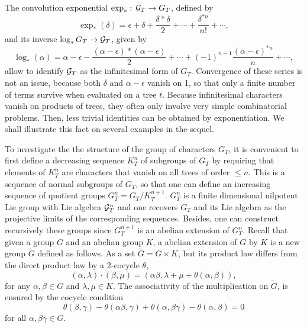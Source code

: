 \documentclass[10pt,here,feynmf]{article}
\begin{document}
The convolution exponential $\exp_{\ast}:\,{\cal G}_{T}\rightarrow G_{T}$, defined by
\begin{equation}
\exp_{\ast}(\delta)=\epsilon+\delta+\frac{\delta\ast\delta}{2}+\cdots+
\frac{\delta^{\ast n}}{n!}+\cdots,
\end{equation}
and its inverse $\log_{\ast}{G}_{T}\rightarrow {\cal G}_{T}$, given by
\begin{equation}
\log_{\ast}(\alpha)=
\alpha\!-\!\epsilon-\frac{(\alpha\!-\!\epsilon)\ast(\alpha\!-\!\epsilon)}{2}+\cdots+
(-1)^{n-1}\frac{(\alpha\!-\!\epsilon)^{\ast n}}{n}+\cdots,
\end{equation}
allow to identify ${\cal G}_{T}$ as the infinitesimal form of $G_{T}$. Convergence of these series is not an issue, because both $\delta$ and $\alpha-\epsilon$ vanish on 1, 
so that only a finite number of terms survive when evaluated on a tree $t$. Because infinitesimal characters vanish on products of trees,  they often only involve very simple combinatorial problems.  Then, less trivial identities can be obtained by exponentiation. We shall illustrate this fact on several examples in the sequel. 


To investigate the the structure of the group of characters $G_{T}$, it is convenient to first define a decreasing sequence $K_{T}^{n}$ of subgroups of $G_{T}$ by requiring that elements of $K_{T}^{n}$ are characters that vanish on all trees of order $\leq n$. This is a sequence of normal subgroups of $G_{T}$, so that one can define an increasing sequence of quotient groups $G^{n}_{T}=G_{T}/K_{T}^{n+1}$.  $G_{T}^{n}$ is a finite dimensional nilpotent Lie group with Lie algebra ${\cal G}_{T}^{n}$ and one recovers $G_{T}$ and its Lie algebra as the projective limits of the corresponding sequences.  Besides, one can construct recursively these groups since $G_{T}^{n+1}$ is an abelian extension of $G_{T}^{n}$. Recall that given a group $G$ and an abelian group $K$, a abelian extension of $G$ by $K$ is a new group $\tilde{G}$ defined as follows. As a set $\tilde{G}=G\times K$, but its product law differs from the direct product law by a 2-cocycle $\theta$,
\begin{equation}
\left(\alpha,\lambda\right)\cdot\left(\beta,\mu\right)=
\left(\alpha\beta,\lambda+\mu+\theta(\alpha,\beta)\right),
\end{equation}
for any $\alpha,\beta\in G$ and $\lambda,\mu\in K$. The associativity of the multiplication on $\tilde{G}$, is ensured by the cocycle condition
\begin{equation}
\theta(\beta,\gamma)-\theta(\alpha\beta,\gamma)+\theta(\alpha,\beta\gamma)-\theta(\alpha,\beta)=0
\end{equation}
for all $\alpha,\beta\gamma\in G$.
\end{document}
